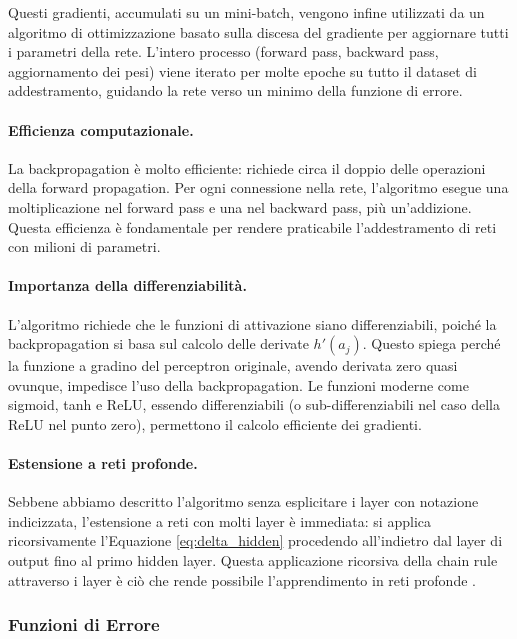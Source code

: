 Questi gradienti, accumulati su un mini-batch, vengono infine utilizzati da un algoritmo di ottimizzazione basato sulla discesa del gradiente per aggiornare tutti i parametri della rete. L'intero processo (forward pass, backward pass, aggiornamento dei pesi) viene iterato per molte epoche su tutto il dataset di addestramento, guidando la rete verso un minimo della funzione di errore.

\paragraph{Efficienza computazionale.}
La backpropagation è molto efficiente: richiede circa il doppio delle operazioni della forward propagation. Per ogni connessione nella rete, l'algoritmo esegue una moltiplicazione nel forward pass e una nel backward pass, più un'addizione. Questa efficienza è fondamentale per rendere praticabile l'addestramento di reti con milioni di parametri.

\paragraph{Importanza della differenziabilità.} 
L'algoritmo richiede che le funzioni di attivazione siano differenziabili, poiché la backpropagation si basa sul calcolo delle derivate $h'(a_j)$. Questo spiega perché la funzione a gradino del perceptron originale, avendo derivata zero quasi ovunque, impedisce l'uso della backpropagation. Le funzioni moderne come sigmoid, tanh e ReLU, essendo differenziabili (o sub-differenziabili nel caso della ReLU nel punto zero), permettono il calcolo efficiente dei gradienti.

\paragraph{Estensione a reti profonde.} 
Sebbene abbiamo descritto l'algoritmo senza esplicitare i layer con notazione indicizzata, l'estensione a reti con molti layer è immediata: si applica ricorsivamente l'Equazione \ref{eq:delta_hidden} procedendo all'indietro dal layer di output fino al primo hidden layer. Questa applicazione ricorsiva della chain rule attraverso i layer è ciò che rende possibile l'apprendimento in reti profonde \cite{goodfellow2016deep}.

\subsubsection{Funzioni di Errore}

